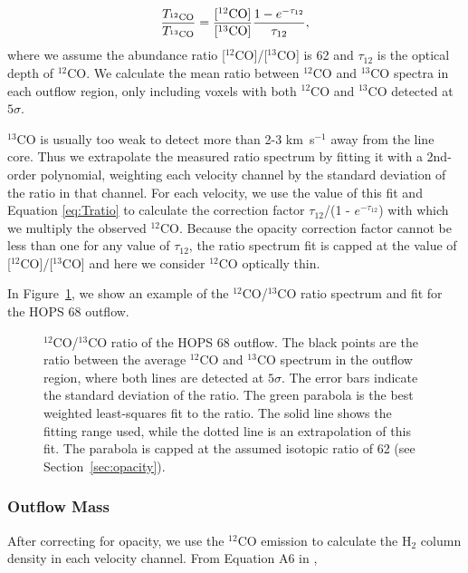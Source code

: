 \documentclass[twocolumn]{aastex63}
\newcommand{\example}{HOPS 68}
\newcommand{\kms}{km~s$^{-1}$}
\newcommand{\co}[1][]{\ensuremath{^{#1}}CO}
\begin{document}
\begin{equation}\label{eq:Tratio}
\frac{T_{\rm \co[12]}}{T_{\rm \co[13]}} = \frac{[\rm{\co[12]}]}{[\rm{\co[13]}]} \frac{1 - e^{-\tau_{12}}}{\tau_{12}},
\end{equation}
where we assume the abundance ratio [\co[12]]/[\co[13]] is 62 \citep{Langer93} and $\tau_{12}$ is the optical depth of \co[12]{}. We calculate the mean ratio between \co[12]{} and \co[13]{} spectra in each outflow region, only including voxels with both \co[12]{} and \co[13]{} detected at $5\sigma$. 

\co[13]{} is usually too weak to detect more than 2-3 \kms{} away from the line core. Thus we extrapolate the measured ratio spectrum by fitting it with a 2nd-order polynomial, weighting each velocity channel by the standard deviation of the ratio in that channel. For each velocity, we use the value of this fit and Equation \ref{eq:Tratio} to calculate the correction factor $\tau_{12}$/(1 - $e^{-\tau_{12}}$) with which we multiply the observed \co[12]{}. Because the opacity correction factor cannot be less than one for any value of $\tau_{12}$, the ratio spectrum fit is capped at the value of [\co[12]]/[\co[13]] and here we consider \co[12]{} optically thin.

In Figure~\ref{fig:opacity}, we show an example of the \co[12]{}/\co[13]{} ratio spectrum and fit for the \example{} outflow. 

\begin{figure}
\caption{\co[12]{}/\co[13]{} ratio of the \example{} outflow. The black points are the ratio between the average \co[12]{} and \co[13]{} spectrum in the outflow region, where both lines are detected at $5\sigma$. The error bars indicate the standard deviation of the ratio. The green parabola is the best weighted least-squares fit to the ratio. The solid line shows the fitting range used, while the dotted line is an extrapolation of this fit. The parabola is capped at the assumed isotopic ratio of 62 (see Section~\ref{sec:opacity}).\label{fig:opacity}}
\end{figure}

\subsubsection{Outflow Mass}\label{sec:dmdv}
After correcting for opacity, we use the \co[12]{} emission to calculate the H$_2$ column density in each velocity channel. From Equation A6 in \citet{ZhangY16},
\end{document}
